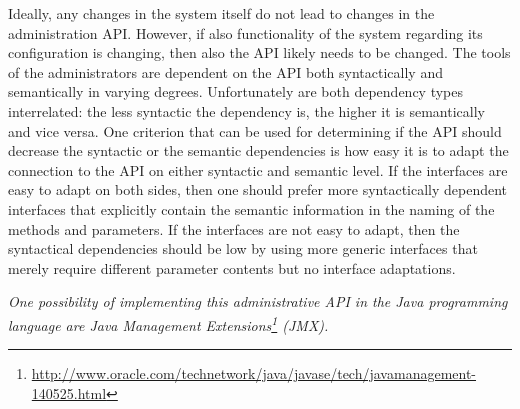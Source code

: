 Ideally, any changes in the system itself do not lead to changes in the administration API. However, if also functionality of the system regarding its configuration is changing, then also the API likely needs to be changed. The tools of the administrators are dependent on the API both syntactically and semantically in varying degrees. Unfortunately are both dependency types interrelated: the less syntactic the dependency is, the higher it is semantically and vice versa. One criterion that can be used for determining if the API should decrease the syntactic or the semantic dependencies is how easy it is to adapt the connection to the API on either syntactic and semantic level. If the interfaces are easy to adapt on both sides, then one should prefer more syntactically dependent interfaces that explicitly contain the semantic information in the naming of the methods and parameters. If the interfaces are not easy to adapt, then the syntactical dependencies should be low by using more generic interfaces that merely require different parameter contents but no interface adaptations.  





\textit{One possibility of implementing this administrative API in the Java programming language are Java Management Extensions\footnote{\url{http://www.oracle.com/technetwork/java/javase/tech/javamanagement-140525.html}} (JMX). }
%
%
%
